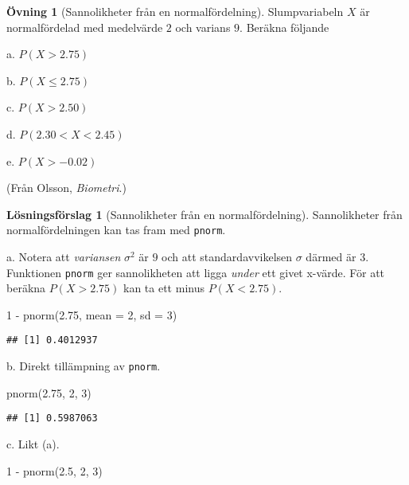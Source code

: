 \documentclass[
]{book}
\newenvironment{Shaded}{\begin{snugshade}}{\end{snugshade}}
\newcommand{\AttributeTok}[1]{\textcolor[rgb]{0.77,0.63,0.00}{#1}}
\newcommand{\DecValTok}[1]{\textcolor[rgb]{0.00,0.00,0.81}{#1}}
\newcommand{\FloatTok}[1]{\textcolor[rgb]{0.00,0.00,0.81}{#1}}
\newcommand{\FunctionTok}[1]{\textcolor[rgb]{0.00,0.00,0.00}{#1}}
\newcommand{\NormalTok}[1]{#1}
\newcommand{\SpecialCharTok}[1]{\textcolor[rgb]{0.00,0.00,0.00}{#1}}
\theoremstyle{definition}
\theoremstyle{definition}
\theoremstyle{definition}
\newtheorem{exercise}{Övning}[chapter]
\theoremstyle{definition}
\newtheorem{hypothesis}{Lösningsförslag}[chapter]
\theoremstyle{remark}
\begin{document}
\begin{exercise}[Sannolikheter från en normalfördelning]
Slumpvariabeln \(X\) är normalfördelad med medelvärde \(2\) och varians \(9\). Beräkna följande

a. \(P(X > 2.75)\)

b. \(P(X \leq 2.75)\)

c. \(P(X > 2.50)\)

d. \(P(2.30 < X < 2.45)\)

e. \(P(X > -0.02)\)

(Från Olsson, \emph{Biometri}.)
\end{exercise}

\begin{hypothesis}[Sannolikheter från en normalfördelning]
Sannolikheter från normalfördelningen kan tas fram med \texttt{pnorm}.

a. Notera att \emph{variansen} \(\sigma^2\) är \(9\) och att standardavvikelsen \(\sigma\) därmed är \(3\). Funktionen \texttt{pnorm} ger sannolikheten att ligga \emph{under} ett givet x-värde. För att beräkna \(P(X > 2.75)\) kan ta ett minus \(P(X < 2.75)\).

\begin{Shaded}
\begin{Highlighting}[]
\DecValTok{1} \SpecialCharTok{{-}} \FunctionTok{pnorm}\NormalTok{(}\FloatTok{2.75}\NormalTok{, }\AttributeTok{mean =} \DecValTok{2}\NormalTok{, }\AttributeTok{sd =} \DecValTok{3}\NormalTok{)}
\end{Highlighting}
\end{Shaded}

\begin{verbatim}
## [1] 0.4012937
\end{verbatim}

b. Direkt tillämpning av \texttt{pnorm}.

\begin{Shaded}
\begin{Highlighting}[]
\FunctionTok{pnorm}\NormalTok{(}\FloatTok{2.75}\NormalTok{, }\DecValTok{2}\NormalTok{, }\DecValTok{3}\NormalTok{)}
\end{Highlighting}
\end{Shaded}

\begin{verbatim}
## [1] 0.5987063
\end{verbatim}

c. Likt (a).

\begin{Shaded}
\begin{Highlighting}[]
\DecValTok{1} \SpecialCharTok{{-}} \FunctionTok{pnorm}\NormalTok{(}\FloatTok{2.5}\NormalTok{, }\DecValTok{2}\NormalTok{, }\DecValTok{3}\NormalTok{)}
\end{Highlighting}
\end{Shaded}


\end{hypothesis}
\end{document}
